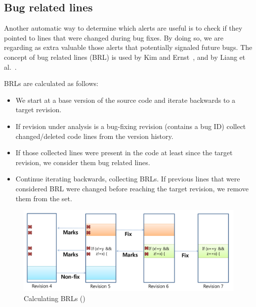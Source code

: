 \subsection{Bug related lines}

Another automatic way to determine which alerts are useful is to check if they pointed to lines that were changed during bug fixes. By doing so, we are regarding as extra valuable those alerts that potentially signaled future bugs. The concept of bug related lines (BRL) is used by Kim and Ernst~\cite{which_warnings}, and by Liang et al.~\cite{automatic_training_set}.

BRLs are calculated as follows:
\begin{itemize}
    \item We start at a base version of the source code and iterate backwards to a target revision. 
    \item If revision under analysis is a bug-fixing revision (contains a bug ID) collect changed/deleted code lines from the version history.
    \item If those collected lines were present in the code at least since the target revision, we consider them bug related lines.
    \item Continue iterating backwards, collecting BRLs. If previous lines that were considered BRL were changed before reaching the target revision, we remove them from the set. 
\end{itemize}


\begin{figure}[H]
    \centering
    \includegraphics[scale=0.3]{./src/brl_example.png}
    \caption{Calculating BRLs (\cite{which_warnings})}
    \label{fig:calculating-brls} %
\end{figure}

